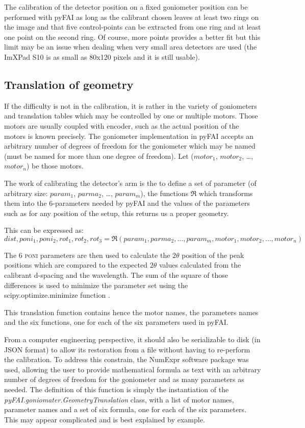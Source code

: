 \documentclass[preprint]{iucr}              %
\begin{document}
The calibration of the detector position on a fixed goniometer position can be
performed with pyFAI as long as the calibrant chosen leaves at least two rings
on the image and that five control-points can be extracted from one ring and
at least one point on the second ring. 
Of course, more points provides a better fit but this limit may be an issue
when dealing when very small area detectors are used (the ImXPad S10 is as
small as 80x120 pixels and it is still usable).

\subsection{Translation of geometry}

If the difficulty is not in the calibration, it is  rather in the variety of
goniometers and translation tables which may be controlled by one or multiple
motors.
Those motors are usually coupled with encoder, such as the actual position of
the motors is known precisely.
The goniometer implementation in pyFAI accepts an
arbitrary number of degrees of freedom for the goniometer which may be named 
(must be named for more than one degree of freedom). 
Let ($motor_1$, $motor_2$, \ldots, $motor_n$) be those motors. 

The work of calibrating the detector's arm is the to define a set of parameter
(of arbitrary size: $param_1$, $parma_2$, \ldots, $param_m$), the functions
$\Re$ which transforms them into the 6-parameters needed by pyFAI and the values
of the parameters such as for any position of the setup, this returns us a
proper geometry.

This can be expressed as:
$$
dist, poni_1, poni_2, rot_1, rot_2, rot_3 = \Re(param_1, parma_2, \ldots,
param_m, motor_1, motor_2, \ldots, motor_n) 
$$

The 6 \textsc{poni} parameters are then used to calculate the $2\theta$
position of the peak positions which are compared to the expected $2\theta$
values calculated from the calibrant d-spacing and the wavelength. 
The sum of the square of those differences is used to minimize the parameter set
using the scipy.optimize.minimize function \cite{scipy}.

This translation function contains hence the motor names, the parameters names
and the six functions, one for each of the six parameters used in pyFAI. 

From a computer engineering perspective, it should also be serializable to 
disk (in JSON format) to allow its restoration from a file without having to
re-perform the calibration. 
To address this constrain, the NumExpr software package  \cite{numexpr} was
used, allowing the user to provide mathematical formula as text with an
arbitrary number of degrees of freedom for the goniometer and as many parameters
as needed.
The definition of this function is simply the instantiation of the
\textit{pyFAI.goniomater.GeometryTranslation} class, with a list of motor names,
parameter names and a set of six formula, one for each of the six parameters. 
This may appear complicated and is best explained by example.
\end{document}
